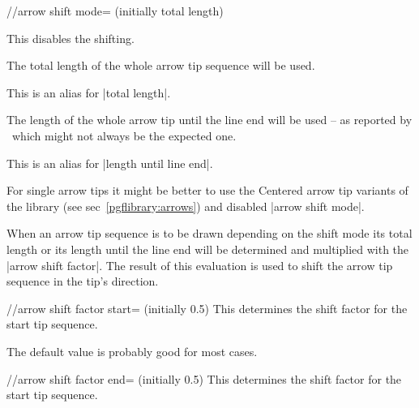 \begin{multicols}{2}
\begin{key}{/\tikzext/arrow shift mode= (initially total length)}
\begin{description}
  This disables the shifting.
\item[|arrow shift mode|=\declare{|total length|}]

  The total length of the whole arrow tip sequence will be used.
\item[|arrow shift mode|=\declare{|total|}]

  This is an alias for |total length|.
\item[|arrow shift mode|=\declare{|length until line end|}]

  The length of the whole arrow tip until the line end will be used --
  as reported by \pgfname\ which might not always be the expected one.
\item[|arrow shift mode|=\declare{|line end|}]

  This is an alias for |length until line end|.
\end{description}
\begin{codeexample}[preamble=\usetikzlibrary{ext.arrows-plus}]
\end{codeexample}

For single arrow tips it might be better to use the Centered arrow tip variants
of the  library (see sec~\ref{pgflibrary:arrows})
and disabled |arrow shift mode|.
\end{key}

When an arrow tip sequence is to be drawn depending on the shift mode
its total length or its length until the line end will be determined
and multiplied with the |arrow shift factor|.
The result of this evaluation is used to shift the arrow tip sequence
in the tip's direction.

\begin{key}{/\tikzext/arrow shift factor start= (initially 0.5)}
  This determines the shift factor for the start tip sequence.
  
  The default value is probably good for most cases.
\end{key}
\begin{key}{/\tikzext/arrow shift factor end= (initially 0.5)}
  This determines the shift factor for the start tip sequence.
  

\end{key}
\end{multicols}

